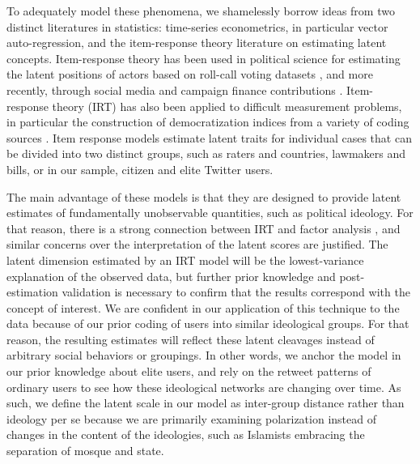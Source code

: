 \documentclass[12pt]{article}
\begin{document}
 To adequately model these phenomena, we shamelessly borrow ideas from two distinct literatures in statistics: time-series econometrics, in particular vector auto-regression, and the item-response theory literature on estimating latent concepts. Item-response theory has been used in political science for estimating the latent positions of actors based on roll-call voting datasets \parencite{jackman2004}, and more recently, through social media and campaign finance contributions \parencite{bonica2014,barbera2015}. Item-response theory (IRT) has also been applied to difficult measurement problems, in particular the construction of democratization indices from a variety of coding sources \parencite{vdem2017,treier2008}. Item response models estimate latent traits for individual cases that can be divided into two distinct groups, such as raters and countries, lawmakers and bills, or in our sample, citizen and elite Twitter users. 

The main advantage of these models is that they are designed to provide latent estimates of fundamentally unobservable quantities, such as political ideology. For that reason, there is a strong connection between IRT and factor analysis \parencite{takane1986}, and similar concerns over the interpretation of the latent scores are justified. The latent dimension estimated by an IRT model will be the lowest-variance explanation of the observed data, but further prior knowledge and post-estimation validation is necessary to confirm that the results correspond with the concept of interest. We are confident in our application of this technique to the data because of our prior coding of users into similar ideological groups. For that reason, the resulting estimates will reflect these latent cleavages instead of arbitrary social behaviors or groupings. In other words, we anchor the model in our prior knowledge about elite users, and rely on the retweet patterns of ordinary users to see how these ideological networks are changing over time. As such, we define the latent scale in our model as inter-group distance rather than ideology per se because we are primarily examining polarization instead of changes in the content of the ideologies, such as Islamists embracing the separation of mosque and state.
\end{document}
